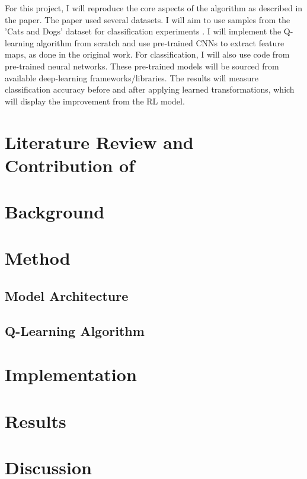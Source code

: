 \documentclass[10pt,twocolumn,letterpaper]{article}
\begin{document}
For this project, I will reproduce the core aspects of the algorithm as described in the paper. The paper used several datasets. I will aim to use samples from the 'Cats and Dogs' dataset for classification experiments \cite{parkhiCatsDogs2012}. I will implement the Q-learning algorithm from scratch and use pre-trained CNNs to extract feature maps, as done in the original work. For classification, I will also use code from pre-trained neural networks. These pre-trained models will be sourced from available deep-learning frameworks/libraries. The results will measure classification accuracy before and after applying learned transformations, which will display the improvement from the RL model.

\section{Literature Review and Contribution of \cite{hafizImageClassificationReinforcement2022}}
\section{Background}

\section{Method}
\subsection{Model Architecture}
\subsection{Q-Learning Algorithm}

\section{Implementation}
\section{Results}
\section{Discussion}
\newpage
{\small



}
\end{document}
